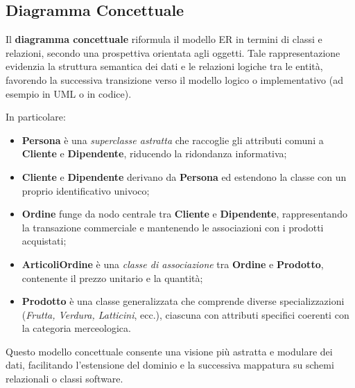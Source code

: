 \documentclass[a4paper,12pt]{article}
\begin{document}
\subsection{Diagramma Concettuale}
Il \textbf{diagramma concettuale} riformula il modello ER in termini di classi e relazioni, secondo una prospettiva orientata agli oggetti. 
Tale rappresentazione evidenzia la struttura semantica dei dati e le relazioni logiche tra le entità, favorendo la successiva transizione verso il modello logico o implementativo (ad esempio in UML o in codice).

In particolare:
\begin{itemize}
    \item \textbf{Persona} è una \emph{superclasse astratta} che raccoglie gli attributi comuni a \textbf{Cliente} e \textbf{Dipendente}, riducendo la ridondanza informativa;
    \item \textbf{Cliente} e \textbf{Dipendente} derivano da \textbf{Persona} ed estendono la classe con un proprio identificativo univoco;
    \item \textbf{Ordine} funge da nodo centrale tra \textbf{Cliente} e \textbf{Dipendente}, rappresentando la transazione commerciale e mantenendo le associazioni con i prodotti acquistati;
    \item \textbf{ArticoliOrdine} è una \emph{classe di associazione} tra \textbf{Ordine} e \textbf{Prodotto}, contenente il prezzo unitario e la quantità;
    \item \textbf{Prodotto} è una classe generalizzata che comprende diverse specializzazioni (\emph{Frutta, Verdura, Latticini}, ecc.), ciascuna con attributi specifici coerenti con la categoria merceologica.
\end{itemize}

Questo modello concettuale consente una visione più astratta e modulare dei dati, facilitando l’estensione del dominio e la successiva mappatura su schemi relazionali o classi software.
\end{document}
